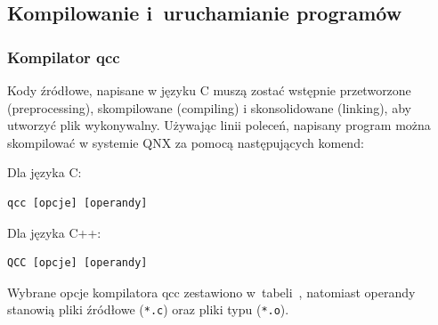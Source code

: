 \subsection{Kompilowanie i~uruchamianie programów}

\subsubsection{Kompilator qcc}

Kody źródłowe, napisane w języku C muszą zostać wstępnie przetworzone (preprocessing), skompilowane (compiling) i skonsolidowane (linking), aby utworzyć plik wykonywalny. Używając linii poleceń, napisany program można skompilować w systemie QNX za pomocą następujących komend:


Dla języka C:

\begin{lstlisting}[style=MyBashStyle]
qcc [opcje] [operandy]
\end{lstlisting}

Dla języka C++:

\begin{lstlisting}[style=MyBashStyle]
QCC [opcje] [operandy]
\end{lstlisting}

Wybrane opcje kompilatora qcc zestawiono w~tabeli~, natomiast operandy stanowią pliki źródłowe (\lstinline[style=MyBashStyle]{*.c}) oraz pliki typu (\lstinline[style=MyBashStyle]{*.o}).

